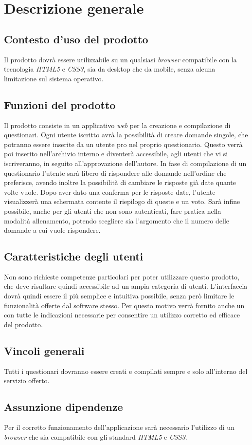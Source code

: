\newpage
\section{Descrizione generale}
\subsection{Contesto d'uso del prodotto}
Il prodotto dovrà essere utilizzabile su un qualsiasi \textit{browser} compatibile con la tecnologia \textit{HTML5} e \textit{CSS3}, sia da desktop che da mobile, senza alcuna limitazione sul sistema operativo.

\subsection{Funzioni del prodotto}
Il prodotto consiste in un applicativo \textit{web} per la creazione e compilazione di questionari. Ogni utente iscritto avrà la possibilità di creare domande singole, che potranno essere inserite da un utente pro nel proprio questionario. Questo verrà poi inserito nell'archivio interno e diventerà accessibile, agli utenti che vi si iscriveranno, in seguito all'approvazione dell'autore. In fase di compilazione di un questionario l'utente sarà libero di rispondere alle domande nell'ordine che preferisce, avendo inoltre la possibilità di cambiare le risposte già date quante volte vuole. Dopo aver dato una conferma per le risposte date, l'utente visualizzerà una schermata contente il riepilogo di queste e un voto. Sarà infine possibile, anche per gli utenti che non sono autenticati, fare pratica nella modalità allenamento, potendo scegliere sia l'argomento che il numero delle domande a cui vuole rispondere.

\subsection{Caratteristiche degli utenti}
Non sono richieste competenze particolari per poter utilizzare questo prodotto, che deve risultare quindi accessibile ad un ampia categoria di utenti. L'interfaccia dovrà quindi essere il più semplice e intuitiva possibile, senza però limitare le funzionalità offerte dal software stesso. Per questo motivo verrà fornito anche un \textit{\MU} con tutte le indicazioni necessarie per consentire un utilizzo corretto ed efficace del prodotto.
\subsection{Vincoli generali}
Tutti i questionari dovranno essere creati e compilati sempre e solo all'interno del servizio offerto.
\subsection{Assunzione dipendenze}
Per il corretto funzionamento dell'applicazione sarà necessario l'utilizzo di un \textit{browser} che sia compatibile con gli standard \textit{HTML5} e \textit{CSS3}.